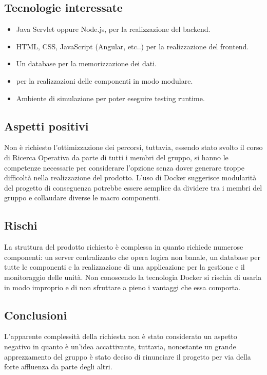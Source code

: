 \documentclass[../studio-di-fattibilita.tex]{subfiles}
\begin{document}
\subsection{Tecnologie interessate}%
\label{sub:c5_tecnologie_interessate}
\begin{itemize}
  \item Java Servlet oppure Node.js, per la realizzazione del backend.
  \item HTML, CSS, JavaScript (Angular, etc..) per la realizzazione del frontend.
  \item Un database per la memorizzazione dei dati.
  \item {} per la realizzazioni delle componenti in modo modulare.
  \item Ambiente di simulazione per poter eseguire testing runtime. 
\end{itemize}

\subsection{Aspetti positivi}%
\label{sub:c5_aspetti_positivi}
Non è richiesto l’ottimizzazione dei percorsi, tuttavia, essendo stato svolto il corso di Ricerca Operativa da parte di tutti i membri del gruppo, si hanno le competenze necessarie per considerare l’opzione senza dover generare troppe difficoltà nella realizzazione del prodotto. 
L’uso di Docker suggerisce modularità del progetto di conseguenza potrebbe essere semplice da dividere tra i membri del gruppo e collaudare diverse le macro componenti. 

\subsection{Rischi}%
\label{sub:c5_rischi}
La struttura del prodotto richiesto è complessa in quanto richiede numerose componenti: un server centralizzato che opera logica non banale, un database per tutte le componenti e la realizzazione di una applicazione  per la gestione e il monitoraggio delle unità.
Non conoscendo la tecnologia Docker si rischia di usarla in modo improprio e di non sfruttare a pieno i vantaggi che essa comporta.

\subsection{Conclusioni}%
\label{sub:c5_conclusioni}
L'apparente complessità della richiesta non è stato considerato un aspetto negativo in quanto è un’idea accattivante, tuttavia, nonostante un grande apprezzamento del gruppo è stato deciso di rinunciare il progetto per via della forte affluenza da parte degli altri.
\end{document}
